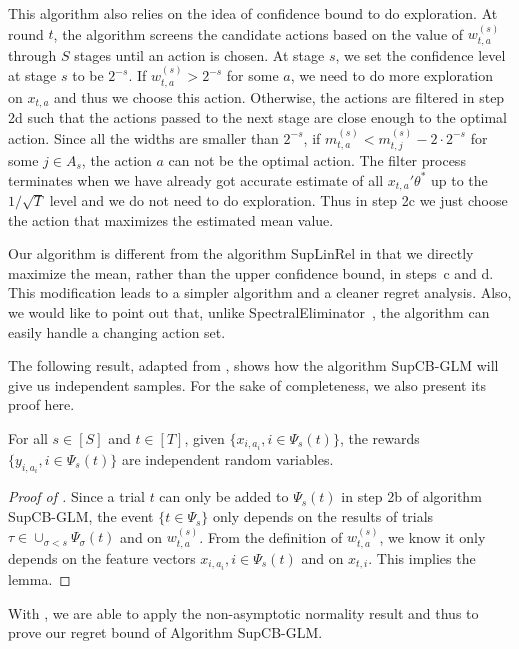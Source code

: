 This algorithm also relies on the idea of confidence bound to do exploration.  At round $t$, the algorithm screens the candidate actions based on the value of $w_{t,a}^{(s)}$ through $S$ stages until an action is chosen. At stage $s$, we set the confidence level at stage $s$ to be $2^{-s}$. If $w_{t,a}^{(s)}>2^{-s}$ for some $a$, we need to do more exploration on $x_{t,a}$ and thus we choose this action. Otherwise, the actions are filtered in step 2d such that the actions passed to the next stage are close enough to the optimal action. Since all the widths are smaller than $2^{-s}$, if $m_{t,a}^{(s)}<m_{t,j}^{(s)}-2\cdot2^{-s}$ for some $j \in A_s$, the action $a$ can not be the optimal action. The filter process terminates when we have already got accurate estimate of all $x_{t,a}'\theta^*$ up to the $1/\sqrt{T}$ level and we do not need to do exploration. Thus in step 2c we just choose the action that maximizes the estimated mean value. 

Our algorithm is different from the algorithm SupLinRel in \citet{auer2003using} that we directly maximize the mean, rather than the upper confidence bound, in steps~c and d. This modification leads to a simpler algorithm and a cleaner regret analysis. Also, we would like to point out that, unlike SpectralEliminator~\cite{valko2014spectral}, the algorithm can easily handle a changing action set.


The following result, adapted from \citet[lemma 14]{auer2003using}, shows how the algorithm SupCB-GLM will give us independent samples. For the sake of completeness, we also present its proof here. 
\begin{lemma}\label{lm:independence}
For all $s \in [S] $ and $t \in [T]$, given $\{x_{i,a_i}, i \in \Psi_s(t)\}$, the rewards $\{y_{i,a_i}, i \in \Psi_s(t)\}$ are independent random variables.
\end{lemma}
\begin{proof} [Proof of ]
Since a trial $t$ can only be added to $\Psi_s(t)$ in step 2b of algorithm SupCB-GLM, the event $\{t \in \Psi_s\}$ only depends on the results of trials $\tau \in \cup_{\sigma<s} \Psi_{\sigma}(t)$ and on $w_{t,a}^{(s)}$. From the definition of $w_{t,a}^{(s)}$, we know it only depends on the feature vectors $x_{i,a_i}, i \in \Psi_s(t)$ and on $x_{t,i}$. This implies the lemma.
\end{proof}

With , we are able to apply the non-asymptotic normality result  and thus to prove our regret bound of Algorithm SupCB-GLM. 

